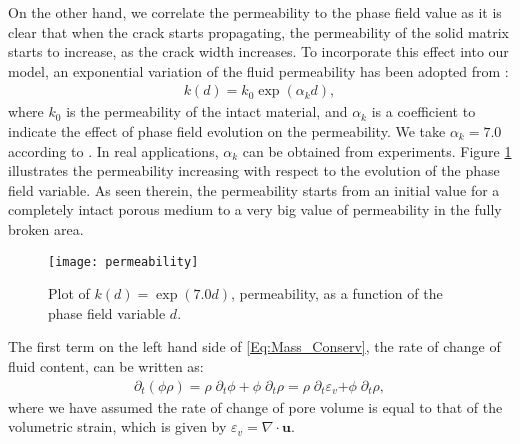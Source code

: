 On the other hand, we correlate the permeability to the phase field value {as it is clear that when the crack starts propagating, the permeability of the solid matrix starts to increase, as the crack width increases. To incorporate this effect into our model, an exponential variation of the fluid permeability has been adopted from \cite{PILLAI201836, ZHU2013179}:}
\begin{equation}\label{Eq:k_0}
\begin{aligned}
k(d) = k_0\exp{\left({\alpha}_k d\right)},
\end{aligned}
\end{equation}
where $k_0$ is the permeability of the intact material, and ${\alpha}_k$ is a coefficient to indicate the effect of phase field evolution on the permeability. We take ${\alpha}_k=7.0$ { according to \cite{ZHU2013179}. In real applications, ${\alpha}_k$ can be obtained from experiments.} %
Figure \ref{Fig:Permeability_increments} illustrates the permeability increasing with respect to the evolution of the phase field variable. {As seen therein, the permeability starts from an initial value for a completely intact porous medium to a very big value of permeability in the fully broken area.}


\begin{figure}[htbp]
	\centering
	\texttt{[image: permeability]}
	\caption{Plot of $k(d)=\exp(7.0 d)$, permeability, as a function of the phase field variable $d$.}
	\label{Fig:Permeability_increments}
\end{figure}

The first term on the left hand side of \eqref{Eq:Mass_Conserv}, the rate of change of fluid content, can be written as:
\begin{equation}\label{Eq:diff_m}
\begin{aligned}
\partial_t\left(\phi\rho\right) = \rho \; \partial_t \phi +\phi \; \partial_t \rho  = \rho \;  \partial_t \varepsilon_v{+\phi \; \partial_t \rho},
\end{aligned}
\end{equation}
where we have assumed the rate of change of pore volume is equal to that of the volumetric strain, which is given by $\varepsilon_v= \nabla \cdot \bm{u}$. 

